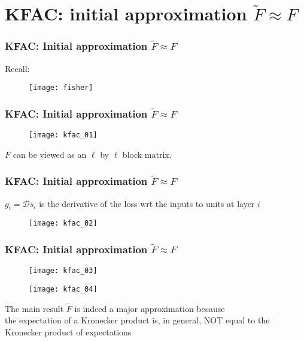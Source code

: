 \section{KFAC: initial approximation $\tilde{F} \approx F$}

\begin{frame}
\frametitle{KFAC: Initial approximation $\tilde{F} \approx F$}

Recall:
\begin{figure}
    \raggedright
    \texttt{[image: fisher]}
\end{figure}

\end{frame}

\begin{frame}
\frametitle{KFAC: Initial approximation $\tilde{F} \approx F$}

\begin{figure}
    \raggedright
    \texttt{[image: kfac\_01]}
\end{figure}

$F$ can be viewed as an $\ell$ by $\ell$ block matrix.
\end{frame}

\begin{frame}
\frametitle{KFAC: Initial approximation $\tilde{F} \approx F$}

$g_i = \mathcal{D}s_i$ is the derivative of the loss wrt the inputs to units at layer $i$
\begin{figure}
    \raggedright
    \texttt{[image: kfac\_02]}
\end{figure}

\end{frame}

\begin{frame}
\frametitle{KFAC: Initial approximation $\tilde{F} \approx F$}

\begin{figure}
    \raggedright
    \texttt{[image: kfac\_03]}
\end{figure}

\begin{figure}
    \raggedright
    \texttt{[image: kfac\_04]}
\end{figure}

The main result $\tilde{F}$ is indeed a major approximation because\\
the expectation of a Kronecker product is, in general, NOT
equal to the Kronecker product of expectations

\end{frame}

